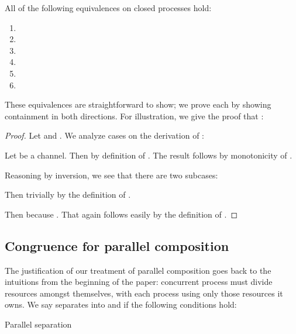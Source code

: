 \documentclass{entcs}
\begin{document}
\begin{lemma}
All of the following equivalences on closed processes hold:
\begin{enumerate}
\item 
\item 
\item 
\item 
\item 
\item 
\end{enumerate}
\end{lemma}
\noindent
These equivalences are straightforward to show; we prove each by
showing containment in both directions.  For illustration, we give the
proof that :
\begin{proof}
Let  and .  
We analyze cases on the derivation of :


\vskip 2pt\noindent
Let  be a channel.  Then  by definition of .  The result follows by
monotonicity of .


\vskip 2pt

Reasoning by inversion, we see that there are two subcases:


\vskip 4pt

Then  trivially
by the definition of .


\vskip 4pt

Then  because .  That  again
follows easily by the definition of .
\end{proof}

\subsection{Congruence for parallel composition}

The justification of our treatment of parallel composition goes back
to the intuitions from the beginning of the paper: concurrent process
must divide resources amongst themselves, with each process using only
those resources it owns.  We say  separates into 
and  if the following conditions hold:
\begin{display}[]{Parallel separation}

\end{display}
\end{document}
